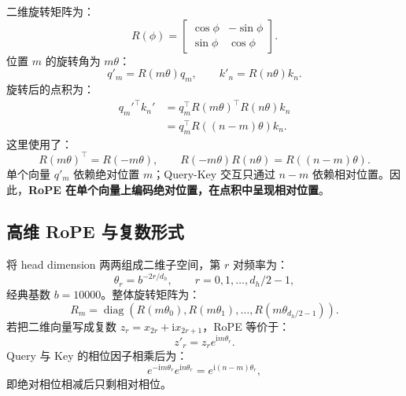\documentclass[UTF8,fontset=none,a4paper,10pt]{ctexart}
\newcommand{\term}[1]{\textbf{#1}}
\begin{document}
二维旋转矩阵为：
\begin{equation}
  R(\phi)=
  \begin{bmatrix}
    \cos\phi&-\sin\phi\\
    \sin\phi&\cos\phi
  \end{bmatrix}.
  \label{eq:rotation}
\end{equation}
位置 $m$ 的旋转角为 $m\theta$：
\begin{equation}
  q'_m=R(m\theta)q_m,\qquad k'_n=R(n\theta)k_n.
  \label{eq:rope-rotate}
\end{equation}
旋转后的点积为：
\begin{equation}
  \begin{aligned}
  q_m'^\top k_n'
  &=q_m^\top R(m\theta)^\top R(n\theta)k_n\\
  &=q_m^\top R((n-m)\theta)k_n.
  \end{aligned}
  \label{eq:rope-core}
\end{equation}
这里使用了：
\begin{equation}
  R(m\theta)^\top=R(-m\theta),\qquad
  R(-m\theta)R(n\theta)=R((n-m)\theta).
  \label{eq:rotation-group}
\end{equation}
单个向量 $q'_m$ 依赖绝对位置 $m$；Query-Key 交互只通过 $n-m$ 依赖相对位置。因此，\term{RoPE 在单个向量上编码绝对位置，在点积中呈现相对位置}。

\subsection{高维 RoPE 与复数形式}

将 head dimension 两两组成二维子空间，第 $r$ 对频率为：
\begin{equation}
  \theta_r=b^{-2r/d_h},\qquad r=0,1,\ldots,d_h/2-1,
  \label{eq:rope-frequency}
\end{equation}
经典基数 $b=10000$。整体旋转矩阵为：
\begin{equation}
  R_m=\operatorname{diag}\left(
  R(m\theta_0),R(m\theta_1),\ldots,R(m\theta_{d_h/2-1})
  \right).
  \label{eq:rope-block}
\end{equation}
若把二维向量写成复数 $z_r=x_{2r}+\mathrm{i}x_{2r+1}$，RoPE 等价于：
\begin{equation}
  z'_r=z_r e^{\mathrm{i}m\theta_r}.
  \label{eq:rope-complex}
\end{equation}
Query 与 Key 的相位因子相乘后为：
\begin{equation}
  e^{-\mathrm{i}m\theta_r}e^{\mathrm{i}n\theta_r}
  =e^{\mathrm{i}(n-m)\theta_r},
  \label{eq:rope-relative-phase}
\end{equation}
即绝对相位相减后只剩相对相位。
\end{document}
